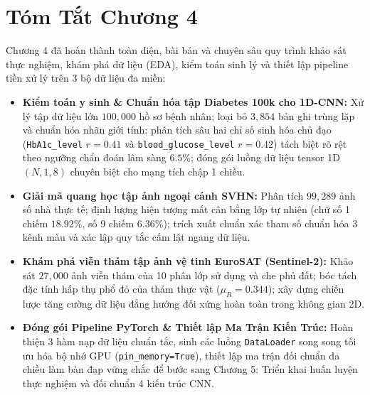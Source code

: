 \documentclass[12pt,a4paper]{report}
\begin{document}
\section{Tóm Tắt Chương 4}
Chương 4 đã hoàn thành toàn diện, bài bản và chuyên sâu quy trình khảo sát thực nghiệm, khám phá dữ liệu (EDA), kiểm toán sinh lý và thiết lập pipeline tiền xử lý trên 3 bộ dữ liệu đa miền:
\begin{itemize}[leftmargin=*]
    \item \textbf{Kiểm toán y sinh \& Chuẩn hóa tập Diabetes 100k cho 1D-CNN:} Xử lý tập dữ liệu lớn $100,000$ hồ sơ bệnh nhân; loại bỏ $3,854$ bản ghi trùng lặp và chuẩn hóa nhãn giới tính; phân tích sâu hai chỉ số sinh hóa chủ đạo (\texttt{HbA1c\_level} $r=0.41$ và \texttt{blood\_glucose\_level} $r=0.42$) tách biệt rõ rệt theo ngưỡng chẩn đoán lâm sàng $6.5\%$; đóng gói luồng dữ liệu tensor 1D $(N, 1, 8)$ chuyên biệt cho mạng tích chập 1 chiều.
    \item \textbf{Giải mã quang học tập ảnh ngoại cảnh SVHN:} Phân tích $99,289$ ảnh số nhà thực tế; định lượng hiện tượng mất cân bằng lớp tự nhiên (chữ số 1 chiếm $18.92\%$, số 9 chiếm $6.36\%$); trích xuất chuẩn xác tham số chuẩn hóa 3 kênh màu và xác lập quy tắc cấm lật ngang dữ liệu.
    \item \textbf{Khám phá viễn thám tập ảnh vệ tinh EuroSAT (Sentinel-2):} Khảo sát $27,000$ ảnh viễn thám của 10 phân lớp sử dụng và che phủ đất; bóc tách đặc tính hấp thụ phổ đỏ của thảm thực vật ($\mu_R = 0.344$); xây dựng chiến lược tăng cường dữ liệu đẳng hướng đối xứng hoàn toàn trong không gian 2D.
    \item \textbf{Đóng gói Pipeline PyTorch \& Thiết lập Ma Trận Kiến Trúc:} Hoàn thiện 3 hàm nạp dữ liệu chuẩn tắc, sinh các luồng \texttt{DataLoader} song song tối ưu hóa bộ nhớ GPU (\texttt{pin\_memory=True}), thiết lập ma trận đối chuẩn đa chiều làm bàn đạp vững chắc để bước sang Chương 5: Triển khai huấn luyện thực nghiệm và đối chuẩn 4 kiến trúc CNN.
\end{itemize}


\end{document}
